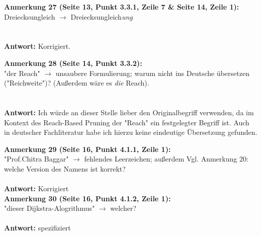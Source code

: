 \documentclass[a4paper,12pt]{book}
\begin{document}
\noindent
\textbf{Anmerkung 27 (Seite 13, Punkt 3.3.1, Zeile 7 \& Seite 14, Zeile 1):}\\
Dreiecksungleich $\rightarrow$ Dreiecksungleich\emph{ung} \\
\\ \\
\textbf{Antwort:}
Korrigiert.

\noindent
\textbf{Anmerkung 28 (Seite 14, Punkt 3.3.2):}\\
"der Reach" $\rightarrow$ unsaubere Formulierung; warum nicht ins Deutsche übersetzen ("Reichweite")? (Außerdem wäre es \emph{die} Reach). \\
\\ \\
\textbf{Antwort:}
Ich würde an dieser Stelle lieber den Originalbegriff verwenden, da im Kontext des Reach-Based Pruning der "Reach" ein festgelegter Begriff ist. Auch in deutscher Fachliteratur habe ich hierzu keine eindeutige Übersetzung gefunden.

\noindent
\textbf{Anmerkung 29 (Seite 16, Punkt 4.1.1, Zeile 1):}\\
"Prof.Chitra Baggar" $\rightarrow$ fehlendes Leerzeichen; außerdem Vgl. Anmerkung 20: welche Version des Namens ist korrekt?\\ \\
\textbf{Antwort:} Korrigiert
\\

\noindent
\textbf{Anmerkung 30 (Seite 16, Punkt 4.1.2, Zeile 1):}\\
"dieser Dijkstra-Alogrithmus" $\rightarrow$ welcher? \\ \\
\textbf{Antwort:} spezifiziert
\\
\end{document}
